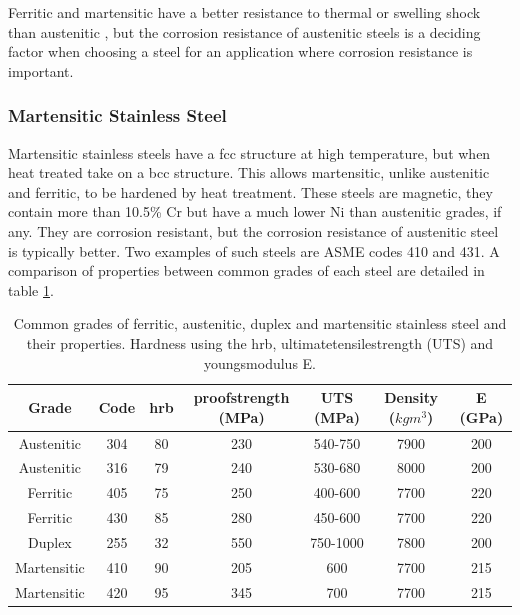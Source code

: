 Ferritic and martensitic have a better resistance to thermal or swelling shock than austenitic \cite{bccfenimodel}, but the corrosion resistance of austenitic steels is a deciding factor when choosing a steel for an application where corrosion resistance is important.



\subsubsection{Martensitic Stainless Steel}

Martensitic stainless steels have a \acrshort{fcc} structure at high temperature, but when heat treated take on a \acrshort{bcc}  structure.  This allows martensitic, unlike austenitic and ferritic, to be hardened by heat treatment.  These steels are magnetic, they contain more than 10.5\% Cr but have a much lower Ni than austenitic grades, if any.  They are corrosion resistant, but the corrosion resistance of austenitic steel is typically better.  Two examples of such steels are ASME codes 410 and 431.  A comparison of properties between common grades of each steel are detailed in table \ref{table:steelproperties}. 


\begin{table}[h]
\begin{center}
\begin{tabular}{c c c c c c c}
\hline\hline
Grade & Code & \acrshort{hrb} & \Gls{proofstrength} (MPa) & UTS (MPa) & Density ($kgm^3$) & E (GPa) \\
\hline\hline
Austenitic      & 304 & 80 & 230 & 540-750  & 7900 & 200 \\
Austenitic      & 316 & 79 & 240 & 530-680  & 8000 & 200 \\
Ferritic        & 405 & 75 & 250 & 400-600  & 7700 & 220 \\
Ferritic        & 430 & 85 & 280 & 450-600  & 7700 & 220 \\
Duplex          & 255 & 32 & 550 & 750-1000 & 7800 & 200 \\
Martensitic     & 410 & 90 & 205 & 600      & 7700 & 215 \\
Martensitic     & 420 & 95 & 345 & 700      & 7700 & 215 \\
\hline\hline
\end{tabular}
\end{center}
\caption{Common grades of ferritic, austenitic, duplex and martensitic stainless steel and their properties.  Hardness using the \acrshort{hrb}, \gls{ultimatetensilestrength} (UTS) and \Gls{youngsmodulus} E.}
\label{table:steelproperties}
\end{table}





